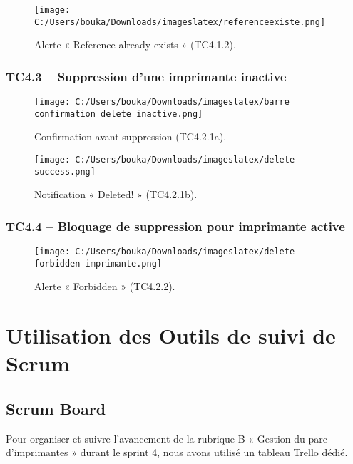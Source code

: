 \documentclass[a4paper,11pt]{report}
\begin{document}
\begin{figure}[H]
  \centering
  \texttt{[image: C:/Users/bouka/Downloads/imageslatex/referenceexiste.png]}
  \caption{Alerte « Reference already exists » (TC4.1.2).}
  \label{fig:add-duplicate}
\end{figure}


\subsubsection*{TC4.3 – Suppression d’une imprimante inactive}

\begin{figure}[H]
  \centering
  \texttt{[image: C:/Users/bouka/Downloads/imageslatex/barre confirmation delete inactive.png]}
  \caption{Confirmation avant suppression (TC4.2.1a).}
  \label{fig:del-confirm}
\end{figure}

\begin{figure}[H]
  \centering
  \texttt{[image: C:/Users/bouka/Downloads/imageslatex/delete success.png]}
  \caption{Notification « Deleted! » (TC4.2.1b).}
  \label{fig:del-success}
\end{figure}


\subsubsection*{TC4.4 – Bloquage de suppression pour imprimante active}

\begin{figure}[H]
  \centering
  \texttt{[image: C:/Users/bouka/Downloads/imageslatex/delete forbidden imprimante.png]}
  \caption{Alerte « Forbidden » (TC4.2.2).}
  \label{fig:delete-active}
\end{figure}


\section{Utilisation des Outils de suivi de Scrum}

\subsection{Scrum Board}

Pour organiser et suivre l’avancement de la rubrique B « Gestion du parc d’imprimantes » durant le sprint 4, nous avons utilisé un tableau Trello dédié.
\end{document}
